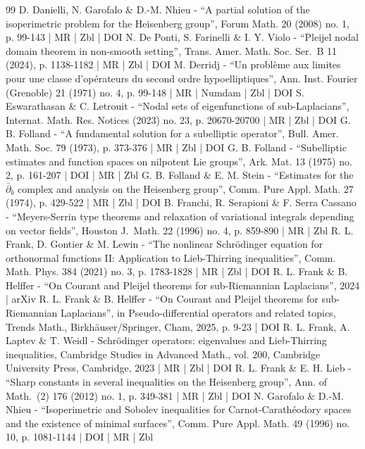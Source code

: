 \begin{thebibliography}{99}
D. Danielli, N. Garofalo \& D.-M. Nhieu - “A partial solution of the isoperimetric problem for the Heisenberg group”, Forum Math. 20 (2008) no. 1, p. 99-143 | MR | Zbl | DOI
N. De Ponti, S. Farinelli \& I. Y. Violo - “Pleijel nodal domain theorem in non-smooth setting”, Trans. Amer. Math. Soc. Ser. B 11 (2024), p. 1138-1182 | MR | Zbl | DOI
M. Derridj - “Un problème aux limites pour une classe d’opérateurs du second ordre hypoelliptiques”, Ann. Inst. Fourier (Grenoble) 21 (1971) no. 4, p. 99-148 | MR | Numdam | Zbl | DOI
S. Eswarathasan \& C. Letrouit - “Nodal sets of eigenfunctions of sub-Laplacians”, Internat. Math. Res. Notices (2023) no. 23, p. 20670-20700 | MR | Zbl | DOI
G. B. Folland - “A fundamental solution for a subelliptic operator”, Bull. Amer. Math. Soc. 79 (1973), p. 373-376 | MR | Zbl | DOI
G. B. Folland - “Subelliptic estimates and function spaces on nilpotent Lie groups”, Ark. Mat. 13 (1975) no. 2, p. 161-207 | DOI | MR | Zbl
G. B. Folland \& E. M. Stein - “Estimates for the $\bar{\partial }_{b}$ complex and analysis on the Heisenberg group”, Comm. Pure Appl. Math. 27 (1974), p. 429-522 | MR | Zbl | DOI
B. Franchi, R. Serapioni \& F. Serra Cassano - “Meyers-Serrin type theorems and relaxation of variational integrals depending on vector fields”, Houston J. Math. 22 (1996) no. 4, p. 859-890 | MR | Zbl
R. L. Frank, D. Gontier \& M. Lewin - “The nonlinear Schrödinger equation for orthonormal functions II: Application to Lieb-Thirring inequalities”, Comm. Math. Phys. 384 (2021) no. 3, p. 1783-1828 | MR | Zbl | DOI
R. L. Frank \& B. Helffer - “On Courant and Pleijel theorems for sub-Riemannian Laplacians”, 2024 | arXiv
R. L. Frank \& B. Helffer - “On Courant and Pleijel theorems for sub-Riemannian Laplacians”, in Pseudo-differential operators and related topics, Trends Math., Birkhäuser/Springer, Cham, 2025, p. 9-23 | DOI
R. L. Frank, A. Laptev \& T. Weidl - Schrödinger operators: eigenvalues and Lieb-Thirring inequalities, Cambridge Studies in Advanced Math., vol. 200, Cambridge University Press, Cambridge, 2023 | MR | Zbl | DOI
R. L. Frank \& E. H. Lieb - “Sharp constants in several inequalities on the Heisenberg group”, Ann. of Math. (2) 176 (2012) no. 1, p. 349-381 | MR | Zbl | DOI
N. Garofalo \& D.-M. Nhieu - “Isoperimetric and Sobolev inequalities for Carnot-Carathéodory spaces and the existence of minimal surfaces”, Comm. Pure Appl. Math. 49 (1996) no. 10, p. 1081-1144 | DOI | MR | Zbl

\end{thebibliography}
